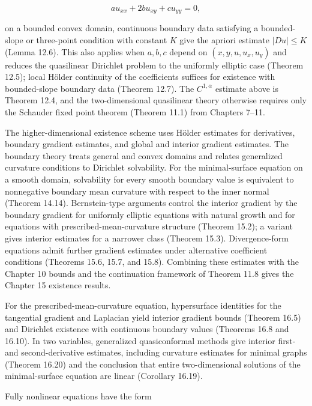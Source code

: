 \begin{equation}\label{gt.eq1.10}
au_{xx}+2bu_{xy}+cu_{yy}=0,
\end{equation}

on a bounded convex domain, continuous boundary data satisfying a bounded-slope
or three-point condition with constant $K$ give the apriori estimate $|Du|\leq K$
(Lemma 12.6). This also applies when $a,b,c$ depend on
$(x,y,u,u_x,u_y)$ and reduces the quasilinear Dirichlet problem to the uniformly
elliptic case (Theorem 12.5); local H\"older continuity of the coefficients suffices
for existence with bounded-slope boundary data (Theorem 12.7). The
$C^{1,\alpha}$ estimate above is Theorem 12.4, and the two-dimensional
quasilinear theory otherwise requires only the Schauder fixed point theorem
(Theorem 11.1) from Chapters 7--11.

The higher-dimensional existence scheme uses H\"older estimates for derivatives,
boundary gradient estimates, and global and interior gradient estimates. The
boundary theory treats general and convex domains and relates generalized
curvature conditions to Dirichlet solvability. For the minimal-surface equation
on a smooth domain, solvability for every smooth boundary value is equivalent to
nonnegative boundary mean curvature with respect to the inner normal
(Theorem 14.14). Bernstein-type arguments control the interior gradient by the
boundary gradient for uniformly elliptic equations with natural growth and for
equations with prescribed-mean-curvature structure (Theorem 15.2); a variant
gives interior estimates for a narrower class (Theorem 15.3). Divergence-form
equations admit further gradient estimates under alternative coefficient
conditions (Theorems 15.6, 15.7, and 15.8). Combining these estimates with the
Chapter 10 bounds and the continuation framework of Theorem 11.8 gives the
Chapter 15 existence results.

For the prescribed-mean-curvature equation, hypersurface identities for the
tangential gradient and Laplacian yield interior gradient bounds (Theorem 16.5)
and Dirichlet existence with continuous boundary values (Theorems 16.8 and
16.10). In two variables, generalized quasiconformal methods give interior first-
and second-derivative estimates, including curvature estimates for minimal graphs
(Theorem 16.20) and the conclusion that entire two-dimensional solutions of the
minimal-surface equation are linear (Corollary 16.19).

Fully nonlinear equations have the form

